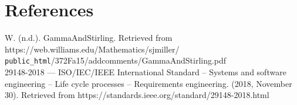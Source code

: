 \documentclass[a4paper, 11pt]{article}
\begin{document}
\section{References}
W. (n.d.). GammaAndStirling. Retrieved from https://web.williams.edu/Mathematics/sjmiller/ \\ \texttt{public\_html}/372Fa15/addcomments/GammaAndStirling.pdf \\

\setlength{\parindent}{1em}
29148-2018 --- ISO/IEC/IEEE International Standard -- Systems and software engineering -- Life cycle processes -- Requirements engineering. (2018, November 30). Retrieved from https://standards.ieee.org/standard/29148-2018.html
\end{document}
